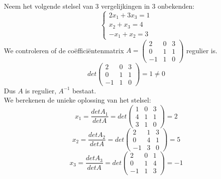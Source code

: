 \begin{voorbeeld}
	

Neem het volgende stelsel van $3$ vergelijkingen in $3$ onbekenden:
\[
\left\{ \begin{array}{c} 2x_1 +3x_3 =1 \\ x_2 + x_3 =4 \\ -x_1 + x_2 =3 \end{array}  
\right.
\]
We controleren of de co\"{e}ffici\"{e}ntenmatrix $A=\left( \begin{matrix} 2 & 0 & 3 \\ 0 & 1 & 1 \\ -1 & 1 & 0 \end{matrix} \right)$ regulier is.
\[ det \left( \begin{matrix} 2 & 0 & 3 \\ 0 & 1 & 1 \\ -1 & 1 & 0 \end{matrix} \right) = 1 \neq 0 \]
Dus $A$ is regulier, $A^{-1}$ bestaat.\\ 

We berekenen de unieke oplossing van het stelsel:
\[  x_1 =\frac{det A_1}{det A}=det \left( \begin{matrix} 1 & 0 & 3 \\ 4 & 1 & 1 \\ 3 & 1 & 0 \end{matrix} \right) = 2 \]
\[  x_2 =\frac{det A_2}{det A}=det \left( \begin{matrix} 2 & 1 & 3 \\ 0 & 4 & 1 \\ -1 & 3 & 0 \end{matrix} \right) = 5 \] 
\[  x_3 =\frac{det A_3}{det A}=det \left( \begin{matrix} 2 & 0 & 1 \\ 0 & 1 & 4 \\ -1 & 1 & 3 \end{matrix} \right) = -1 \]                     


\end{voorbeeld}